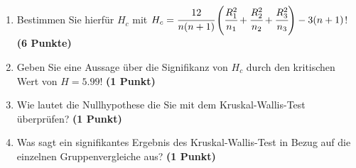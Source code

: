 \documentclass[a4paper, 10pt]{scrartcl}\usepackage[]{graphicx}\usepackage[]{color}
\begin{document}
\begin{enumerate}
\item Bestimmen Sie hierf{\"u}r $H_c$ mit $H_c =
  \cfrac{12}{n(n+1)}\left(\cfrac{R_1^2}{n_1}+\cfrac{R_2^2}{n_2}
    + \cfrac{R_3^2}{n_3}\right)
  - 3(n+1)$! \textbf{(6 Punkte)} 
\item Geben Sie eine Aussage {\"u}ber die Signifikanz von $H_c$ durch
  den kritischen Wert von $H = 5.99$! \textbf{(1 Punkt)}
\item Wie lautet die Nullhypothese die Sie mit dem Kruskal-Wallis-Test
  {\"u}berpr{\"u}fen? \textbf{(1 Punkt)}
\item Was sagt ein signifikantes Ergebnis des Kruskal-Wallis-Test in Bezug
  auf die einzelnen Gruppenvergleiche aus? \textbf{(1 Punkt)}
\end{enumerate} 
\clearpage
\end{document}
